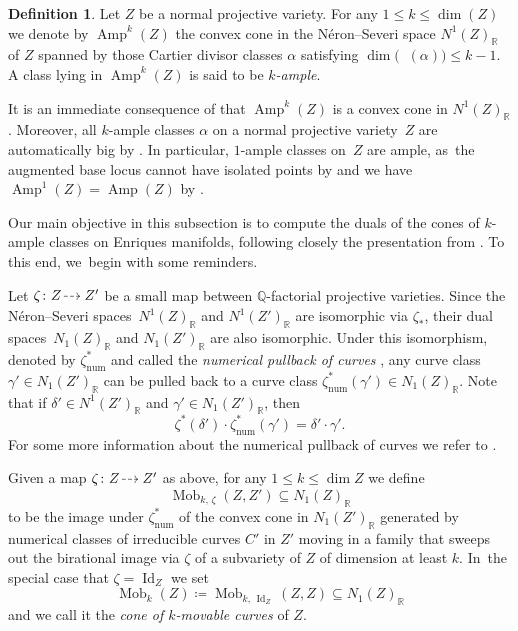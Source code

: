 \documentclass[JEP,XML,SOM,Unicode,published]{cedram}
\newcommand{\dradpl}{{\hspace*{-2.5mm}\begin{tikzcd}[ampersand replacement=\&,column sep = scriptsize]\mbox{}\ar[r,dashed]\&\mbox{}\end{tikzcd}\hspace*{-2.5mm}}}
\newcommand{\dratst}{{\hspace*{-2.5mm}\begin{tikzcd}[ampersand replacement=\&,column sep = small]\mbox{}\ar[r,dashed]\&\mbox{}\end{tikzcd}\hspace*{-2mm}}}
\let\drascst\dratst
\newcommand{\dra}{\mathchoice{\dradpl}{\dratst}{\drascst}{\drascst}}
\theoremstyle{plain}
\theoremstyle{definition}
\newtheorem{dfn}[thm]{Definition}
\newcommand{\Q}{\mathbb{Q}}
\newcommand{\R}{\mathbb{R}}
\DeclareMathOperator{\Id}{Id}
\DeclareMathOperator{\Amp}{\mathrm{Amp}}
\DeclareMathOperator{\Mob}{Mob}
\DeclareMathOperator{\abs}{\boldsymbol{B}_{+}}
\begin{document}
\begin{dfn}
\label{dfn:amp_k-cone}
Let $Z$ be a normal projective variety. For any $1\leq k\leq \dim(Z)$ we denote by $\Amp^k(Z)$ the convex cone in the Néron--Severi space $N^1(Z)_\R$ of $Z$ spanned by those Cartier divisor classes $\alpha$ satisfying $\dim \bigl(\abs(\alpha) \bigr) \leq k-1$. A class lying in $\Amp^k(Z)$ is said to be \emph{$k$\nobreakdash-ample}.
\end{dfn}

It is an immediate consequence of \cite[Ex.\,1.8 \& Ex.\,1.9]{ELMNP06} that $\Amp^k(Z)$ is a convex cone in $N^1(Z)_\R$. Moreover, all $k$\nobreakdash-ample classes $\alpha$ on a normal projective variety~$Z$ are automatically big by \cite[Ex.\,1.7]{ELMNP06}.
In particular, $1$\nobreakdash-ample classes on~$Z$ are ample, as~the augmented base locus cannot have isolated points by \cite[Prop.\,1.1]{ELMNP09} and we have $\Amp^1(Z) = \Amp(Z)$ by \cite[Ex.\,1.7]{ELMNP06}.

Our main objective in this subsection is to compute the duals of the cones of $k$\nobreakdash-ample classes on Enriques manifolds, following closely the presentation from \cite[\S 4]{DRO25}. To this end, we~begin with some reminders.

Let $\zeta \colon Z \dra Z'$ be a small map
between $\Q$\nobreakdash-factorial projective varieties. Since the Néron--Severi spaces~$N^1(Z)_\R$ and $N^1(Z')_\R$ are isomorphic via $\zeta_*$, their dual spaces~$N_1(Z)_\R$ and $N_1(Z')_\R$ are also isomorphic. Under this isomorphism, denoted by $\zeta^*_\mathrm{num}$ and called the \emph{numerical pullback of curves} \cite{Araujo10}, any curve class $\gamma' \in N_1(Z')_\R$ can be pulled back to a curve class $\zeta^*_\mathrm{num} (\gamma') \in N_1(Z)_\R$. Note that if $\delta' \in N^1(Z')_\R$ and $\gamma' \in N_1(Z')_\R$, then
\begin{equation}
\label{eq:numerical_pullback_of_curves}
\zeta^* (\delta') \cdot \zeta^*_\mathrm{num} (\gamma') = \delta' \cdot \gamma'.
\end{equation}
For some more information about the numerical pullback of curves we refer to \cite[\S 4]{Araujo10}.

Given a map $\zeta \colon Z \dra Z'$ as above, for any $1 \leq k \leq \dim Z$ we define
\[
\Mob_{k, \,\zeta}(Z,Z') \subseteq N_1(Z)_\R
\]
to be the image under $\zeta^*_\mathrm{num}$ of the convex cone in $N_1(Z')_\R$ generated by numerical classes of irreducible curves $C'$ in $Z'$ moving in a family that sweeps out the birational image via $\zeta$ of a subvariety of $Z$ of dimension at least $k$. In~the special case that $\zeta = \Id_Z$ we set
\[
\Mob_k(Z) \coloneqq \Mob_{k, \,\Id_Z}(Z,Z) \subseteq N_1(Z)_\R
\]
and we call it the \emph{cone of $k$\nobreakdash-movable curves} of $Z$.
\end{document}

